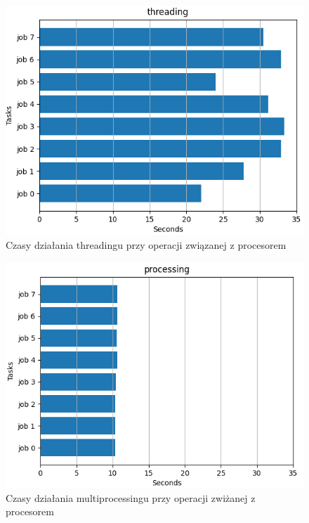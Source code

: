 \begin{figure}
    \includegraphics{zdjecia/threading_cpu}
    \caption{Czasy działania threadingu przy operacji związanej z procesorem}
\end{figure}

\begin{figure}
    \includegraphics{zdjecia/processing_cpu}
    \caption{Czasy działania multiprocessingu przy operacji zwiżanej z procesorem}
\end{figure}
